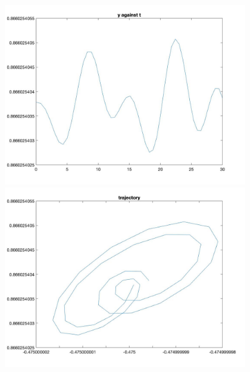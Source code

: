 \documentclass[11pt]{article}
\begin{document}
\begin{figure}[H]
\includegraphics[width = 12cm, height = 8cm]{Q5(5).jpg}
\includegraphics[width = 12cm, height = 8cm]{Q5(6).jpg}
\end{figure}
\end{document}
